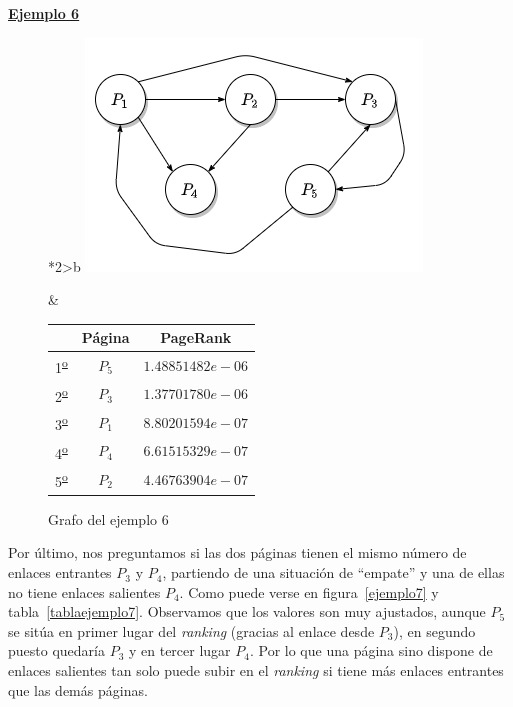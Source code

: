 \documentclass[size=a4, parskip=half, titlepage=false, toc=flat, toc=bib, 12pt, twoside]{scrartcl}
\theoremstyle{theorem-style}
\theoremstyle{definition-style}
\theoremstyle{remark-style}
\theoremstyle{example-style}
\theoremstyle{definition-style}
\theoremstyle{remark-style}
\begin{document}
\underline{\textbf{Ejemplo 6}}

\begin{figure}[!ht]
  \begin{tabular}{*{2}{>{\centering\arraybackslash}b{}}}
  \centering
    \includegraphics[scale=0.5]{./img/grafoej6}
    \caption{Grafo del ejemplo 6}
    \label{ejemplo6}
    &
      \renewcommand{\arraystretch}{1.3}
      \begin{tabular}{ccc}
        & Página & PageRank         \\ \hline
      1\textsuperscript{\underline{o}}} & $P_5$  & $1.48851482e-06$ \\ \hline
      2\textsuperscript{\underline{o}}} & $P_3$  & $1.37701780e-06$ \\ \hline
      3\textsuperscript{\underline{o}}} & $P_1$  & $8.80201594e-07$ \\ \hline
      4\textsuperscript{\underline{o}}} & $P_4$  & $6.61515329e-07$ \\ \hline
      5\textsuperscript{\underline{o}}} & $P_2$  & $4.46763904e-07$ \\ \hline
      \end{tabular}
    \end{tabular}
\end{figure}

Por último, nos preguntamos si las dos páginas tienen el mismo número de enlaces entrantes $P_3$ y $P_4$, partiendo de una situación de ``empate'' y una de ellas no tiene enlaces salientes $P_4$. Como puede verse en figura~\ref{ejemplo7} y tabla~\ref{tablaejemplo7}. Observamos que los valores son muy ajustados, aunque $P_5$ se sitúa en primer lugar del \textit{ranking} (gracias al enlace desde $P_3$), en segundo puesto quedaría $P_3$ y en tercer lugar $P_4$. Por lo que una página sino dispone de enlaces salientes tan solo puede subir en el \textit{ranking} si tiene más enlaces entrantes que las demás páginas.
\end{document}
